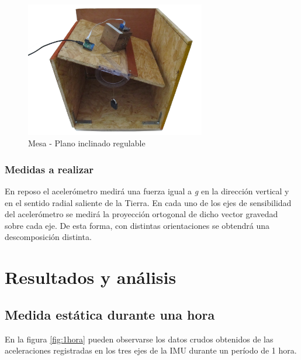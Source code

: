 \documentclass[main]{subfiles}
\begin{document}
\begin{figure}[h!]
	\begin{center}
		\includegraphics[width=0.7\textwidth]{./pics_acc/mesa-flotando.jpg}
	\end{center}
	\vspace{-20pt}
	\caption{Mesa - Plano inclinado regulable}
	\label{fig:mesa-flotando}
\end{figure}

\subsubsection*{Medidas a realizar}
En reposo el acelerómetro medirá una fuerza igual a \textit{g} en la dirección vertical y en el sentido radial saliente de la Tierra. En cada uno de los ejes de sensibilidad del acelerómetro se medirá la proyección ortogonal de dicho vector gravedad sobre cada eje. De esta forma, con distintas orientaciones se obtendrá una descomposición distinta.

\section{Resultados y análisis}
\subsection{Medida estática durante una hora}

En la figura \ref{fig:1hora} pueden observarse los datos crudos obtenidos de las aceleraciones registradas en los tres ejes de la IMU durante un período de 1 hora.
\end{document}
